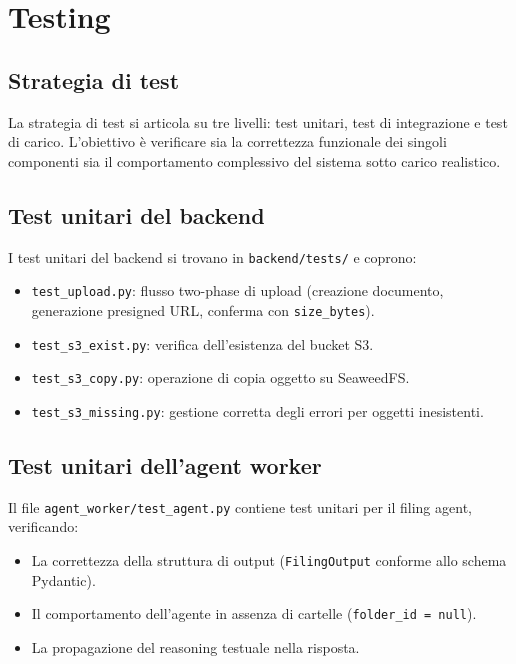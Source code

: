 \chapter{Testing}
\label{chap:testing}

\section{Strategia di test}
\label{sec:test_strategy}

La strategia di test si articola su tre livelli: test unitari, test di integrazione
e test di carico. L'obiettivo \`e verificare sia la correttezza funzionale dei singoli
componenti sia il comportamento complessivo del sistema sotto carico realistico.

\section{Test unitari del backend}
\label{sec:unit_backend}

I test unitari del backend si trovano in \texttt{backend/tests/} e coprono:

\begin{itemize}[leftmargin=*]
    \item \texttt{test\_upload.py}: flusso two-phase di upload (creazione documento,
          generazione presigned URL, conferma con \texttt{size\_bytes}).
    \item \texttt{test\_s3\_exist.py}: verifica dell'esistenza del bucket S3.
    \item \texttt{test\_s3\_copy.py}: operazione di copia oggetto su SeaweedFS.
    \item \texttt{test\_s3\_missing.py}: gestione corretta degli errori per oggetti
          inesistenti.
\end{itemize}

\section{Test unitari dell'agent worker}
\label{sec:unit_agent}

Il file \texttt{agent\_worker/test\_agent.py} contiene test unitari per il filing
agent, verificando:

\begin{itemize}[leftmargin=*]
    \item La correttezza della struttura di output (\texttt{FilingOutput} conforme
          allo schema Pydantic).
    \item Il comportamento dell'agente in assenza di cartelle (\texttt{folder\_id = null}).
    \item La propagazione del reasoning testuale nella risposta.
\end{itemize}

